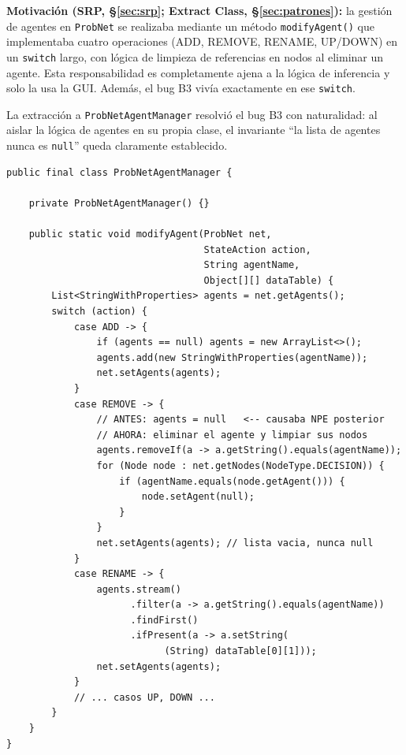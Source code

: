 \documentclass[11pt,a4paper]{article}
\newcommand{\code}[1]{\texttt{#1}}
\begin{document}
\textbf{Motivación (SRP, §\ref{sec:srp}; Extract Class, §\ref{sec:patrones}):}
la gestión de agentes en \code{ProbNet} se realizaba mediante un método
\code{modifyAgent()} que implementaba cuatro operaciones (ADD, REMOVE,
RENAME, UP/DOWN) en un \code{switch} largo, con lógica de limpieza de
referencias en nodos al eliminar un agente.  Esta responsabilidad es
completamente ajena a la lógica de inferencia y solo la usa la GUI.
Además, el bug B3 vivía exactamente en ese \code{switch}.

La extracción a \code{ProbNetAgentManager} resolvió el bug B3 con
naturalidad: al aislar la lógica de agentes en su propia clase, el
invariante ``la lista de agentes nunca es \code{null}'' queda
claramente establecido.

\begin{lstlisting}[caption={Bug B3 corregido en \texttt{ProbNetAgentManager}.},
                   label=lst:agentmanager]
public final class ProbNetAgentManager {

    private ProbNetAgentManager() {}

    public static void modifyAgent(ProbNet net,
                                   StateAction action,
                                   String agentName,
                                   Object[][] dataTable) {
        List<StringWithProperties> agents = net.getAgents();
        switch (action) {
            case ADD -> {
                if (agents == null) agents = new ArrayList<>();
                agents.add(new StringWithProperties(agentName));
                net.setAgents(agents);
            }
            case REMOVE -> {
                // ANTES: agents = null   <-- causaba NPE posterior
                // AHORA: eliminar el agente y limpiar sus nodos
                agents.removeIf(a -> a.getString().equals(agentName));
                for (Node node : net.getNodes(NodeType.DECISION)) {
                    if (agentName.equals(node.getAgent())) {
                        node.setAgent(null);
                    }
                }
                net.setAgents(agents); // lista vacia, nunca null
            }
            case RENAME -> {
                agents.stream()
                      .filter(a -> a.getString().equals(agentName))
                      .findFirst()
                      .ifPresent(a -> a.setString(
                            (String) dataTable[0][1]));
                net.setAgents(agents);
            }
            // ... casos UP, DOWN ...
        }
    }
}
\end{lstlisting}
\end{document}
